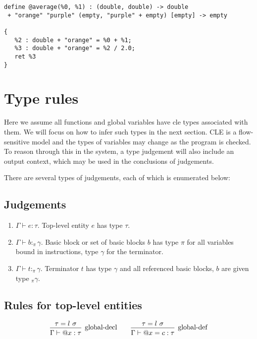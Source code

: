 \documentclass{article}
\begin{document}
\begin{verbatim}
define @average(%0, %1) : (double, double) -> double
 + "orange" "purple" (empty, "purple" + empty) [empty] -> empty
      
{
   %2 : double + "orange" = %0 + %1;
   %3 : double + "orange" = %2 / 2.0;
   ret %3
}
\end{verbatim}

\section{Type rules}
Here we assume all functions and global variables have cle types associated with them.  We will focus on how to infer such types in the next section.
CLE is a flow-sensitive model and the types of variables may change as the program is checked.
To reason through this in the system, a type judgement will also include an output context, which may be used in the conclusions of judgements.

There are several types of judgements, each of which is enumerated below:

\subsection{Judgements}
\begin{enumerate}
    \item $\Gamma \vdash e : \tau$. 
    Top-level entity $e$ has type $\tau$. 
    \item $\Gamma \vdash b :_\pi \gamma$. 
    Basic block or set of basic blocks $b$ has type $\pi$ for all variables bound in instructions, type $\gamma$ for the terminator.
    \item $\Gamma \vdash t :_\pi \gamma$. 
    Terminator $t$ has type $\gamma$ and all referenced basic blocks, $b$ are given type $_\pi \gamma$.
\end{enumerate}

\subsection{Rules for top-level entities}

\[    
\begin{prooftree}
    \hypo{\tau = l\ \sigma}
    \infer1[global-decl]{\Gamma \vdash @x : \tau}
\end{prooftree}
\qquad
\begin{prooftree}
    \hypo{\tau = l\ \sigma}
    \infer1[global-def]{\Gamma \vdash @x = c : \tau}
\end{prooftree}
\]
\end{document}
